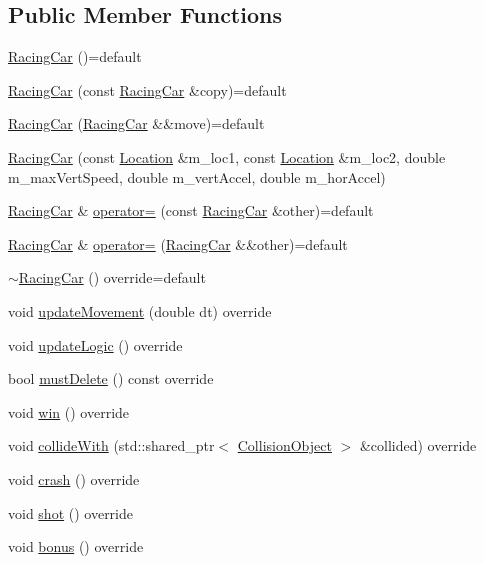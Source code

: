 \subsection*{Public Member Functions}
\begin{DoxyCompactItemize}
\item 
\hyperlink{classroadfighter_1_1RacingCar_ad36c66bdc36a849289d42b5061be2572}{Racing\+Car} ()=default
\item 
\hyperlink{classroadfighter_1_1RacingCar_ad69732f995ae7a2ee44315cd6a3fc69a}{Racing\+Car} (const \hyperlink{classroadfighter_1_1RacingCar}{Racing\+Car} \&copy)=default
\item 
\hyperlink{classroadfighter_1_1RacingCar_aacfc42aa87c6b5db3f4b80f8fbc68c74}{Racing\+Car} (\hyperlink{classroadfighter_1_1RacingCar}{Racing\+Car} \&\&move)=default
\item 
\hyperlink{classroadfighter_1_1RacingCar_a10f2b7ee84e6859a72bccf1b922fc7f2}{Racing\+Car} (const \hyperlink{classroadfighter_1_1Location}{Location} \&m\+\_\+loc1, const \hyperlink{classroadfighter_1_1Location}{Location} \&m\+\_\+loc2, double m\+\_\+max\+Vert\+Speed, double m\+\_\+vert\+Accel, double m\+\_\+hor\+Accel)
\item 
\hyperlink{classroadfighter_1_1RacingCar}{Racing\+Car} \& \hyperlink{classroadfighter_1_1RacingCar_a2df3fdffc4c55aa85a6d9265913aa7b0}{operator=} (const \hyperlink{classroadfighter_1_1RacingCar}{Racing\+Car} \&other)=default
\item 
\hyperlink{classroadfighter_1_1RacingCar}{Racing\+Car} \& \hyperlink{classroadfighter_1_1RacingCar_a370fa9acf725d13ecb5b96ccce61b9d3}{operator=} (\hyperlink{classroadfighter_1_1RacingCar}{Racing\+Car} \&\&other)=default
\item 
\hyperlink{classroadfighter_1_1RacingCar_a1ae41bc99dca96cde8187f4ba2172ea7}{$\sim$\+Racing\+Car} () override=default
\item 
void \hyperlink{classroadfighter_1_1RacingCar_a2e8f3c63381a1fe432cddcc1f34fb935}{update\+Movement} (double dt) override
\item 
void \hyperlink{classroadfighter_1_1RacingCar_af3f3b4c368ba61c13dc9b99004895c5d}{update\+Logic} () override
\item 
bool \hyperlink{classroadfighter_1_1RacingCar_a300bccb330cc8e84834edd5f85354a10}{must\+Delete} () const override
\item 
void \hyperlink{classroadfighter_1_1RacingCar_a24293ac56920da01d29fe99aee8d3ea6}{win} () override
\item 
void \hyperlink{classroadfighter_1_1RacingCar_a1de00cf7c8df548e8ab57a27cefb7345}{collide\+With} (std\+::shared\+\_\+ptr$<$ \hyperlink{classroadfighter_1_1CollisionObject}{Collision\+Object} $>$ \&collided) override
\item 
void \hyperlink{classroadfighter_1_1RacingCar_a2f5018f17852d75682afd78e806b8e4c}{crash} () override
\item 
void \hyperlink{classroadfighter_1_1RacingCar_a20c4363a1d31cc17d7d82c8f9a219d2d}{shot} () override
\item 
void \hyperlink{classroadfighter_1_1RacingCar_a5858dd3f2c7bb49782b29c0a90846a6c}{bonus} () override
\end{DoxyCompactItemize}


